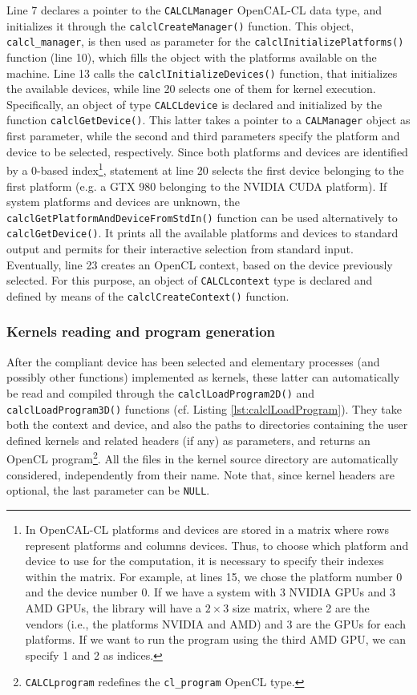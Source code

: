 Line 7 declares a pointer to the \verb'CALCLManager' OpenCAL-CL data
type, and initializes it through the \verb'calclCreateManager()'
function. This object, \verb'calcl_manager', is then used as parameter
for the \verb'calclInitializePlatforms()' function (line 10), which
fills the object with the platforms available on the machine. Line 13
calls the \verb'calclInitializeDevices()' function, that initializes
the available devices, while line 20 selects one of them for kernel
execution. Specifically, an object of type \verb'CALCLdevice' is
declared and initialized by the function \verb'calclGetDevice()'. This
latter takes a pointer to a \verb'CALManager' object as first
parameter, while the second and third parameters specify the platform
and device to be selected, respectively. Since both platforms and
devices are identified by a 0-based index\footnote{In OpenCAL-CL
  platforms and devices are stored in a matrix where rows represent
  platforms and columns devices. Thus, to choose which platform and
  device to use for the computation, it is necessary to specify their
  indexes within the matrix. For example, at lines 15, we chose the
  platform number 0 and the device number 0. If we have a system with
  3 NVIDIA GPUs and 3 AMD GPUs, the library will have a $2 \times 3$
  size matrix, where 2 are the vendors (i.e., the platforms NVIDIA and
  AMD) and 3 are the GPUs for each platforms. If we want to run the
  program using the third AMD GPU, we can specify 1 and 2 as
  indices.}, statement at line 20 selects the first device belonging
to the first platform (e.g. a GTX 980 belonging to the NVIDIA CUDA
platform). If system platforms and devices are unknown, the
\verb'calclGetPlatformAndDeviceFromStdIn()' function can be used
alternatively to \verb'calclGetDevice()'. It prints all the available
platforms and devices to standard output and permits for their
interactive selection from standard input. Eventually, line 23 creates
an OpenCL context, based on the device previously selected. For this
purpose, an object of \verb'CALCLcontext' type is declared and defined
by means of the \verb'calclCreateContext()' function.

\subsubsection{Kernels reading and program generation}

After the compliant device has been selected and elementary processes
(and possibly other functions) implemented as kernels, these latter
can automatically be read and compiled through the
\verb'calclLoadProgram2D()' and \verb'calclLoadProgram3D()' functions
(cf. Listing \ref{lst:calclLoadProgram}). They take both the context
and device, and also the paths to directories containing the user
defined kernels and related headers (if any) as parameters, and
returns an OpenCL program\footnote{\texttt{CALCLprogram} redefines the
  \texttt{cl\_program} OpenCL type.}. All the files in the kernel
source directory are automatically considered, independently from
their name. Note that, since kernel headers are optional, the last
parameter can be \verb'NULL'.

